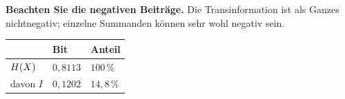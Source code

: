 \begin{aufgabe}
\begin{center}
\begin{minipage}{0.9\textwidth}
\textbf{Beachten Sie die negativen Beiträge.} Die Transinformation ist als Ganzes nichtnegativ; einzelne Summanden können sehr wohl negativ sein.
\end{minipage}
\end{center}

\begin{center}
\renewcommand{\arraystretch}{1.48}
\begin{tabular}{@{}P{2.8cm}P{2.4cm}P{2.4cm}@{}}
\toprule
& \textbf{Bit} & \textbf{Anteil}\\
\midrule
$H(X)$ & $0{,}8113$ & $100\,\%$\\
davon $I$ & $0{,}1202$ & $14{,}8\,\%$\\
\bottomrule
\end{tabular}
\end{center}

\begin{center}
\begin{minipage}{0.88\textwidth}
\end{minipage}
\end{center}
\end{aufgabe}

